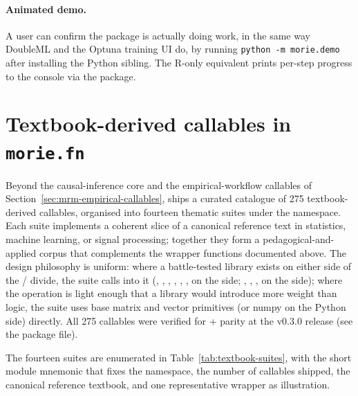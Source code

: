 \documentclass[article,shortnames,nojss]{jss}
\begin{document}
\paragraph{Animated demo.}  A user can confirm the package is
actually doing work, in the same way DoubleML and the Optuna
training UI do, by running \texttt{python -m morie.demo} after
installing the Python sibling.  The R-only equivalent prints
per-step progress to the console via the  package.

\section[Textbook-derived callables in morie.fn]{Textbook-derived callables in \texttt{morie.fn}}\label{sec:textbook-callables}

Beyond the causal-inference core and the empirical-workflow
callables of Section~\ref{sec:mrm-empirical-callables},
 ships a curated catalogue of 275 textbook-derived
callables, organised into fourteen thematic suites under the
 namespace.  Each suite implements a coherent
slice of a canonical reference text in statistics, machine
learning, or signal processing; together they form a
pedagogical-and-applied corpus that complements the wrapper
functions documented above.  The design philosophy is uniform:
where a battle-tested library exists on either side of the
/ divide, the suite calls into it
(, , , ,
, ,  on the
 side; , ,
,  on the 
side); where the operation is light enough that a library would
introduce more weight than logic, the suite uses base 
matrix and vector primitives (or numpy on the Python side)
directly.  All 275 callables were verified for  +
 parity at the v0.3.0 release (see the package
 file).

The fourteen suites are enumerated in
Table~\ref{tab:textbook-suites}, with the short module mnemonic
that fixes the namespace, the number of callables shipped, the
canonical reference textbook, and one representative
 wrapper as illustration.
\end{document}

